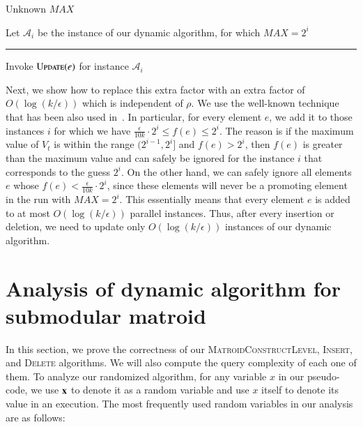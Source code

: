 \documentclass[11pt]{article}
\newcommand{\ceil}[1]{\left\lceil #1 \right\rceil}
\newcommand{\floor}[1]{\left\lfloor #1 \right\rfloor}
\newcommand{\mO}{O}
\newcommand{\update}{\textsc{Update}}
\newcommand{\MatroidConstLevel}{\textsc{MatroidConstructLevel}}
\newcommand{\insertv}{{\textsc{Insert}}}
\newcommand{\deletev}{{\textsc{Delete}}}
\begin{document}
\begin{algorithm}[h] 
\caption{Unknown $MAX$} 
\begin{algorithmic}[1]
    \State Let $\mathcal{A}_i$ be the instance of our dynamic algorithm, for which $MAX=2^i$
    
     \rule{15cm}{0.4pt} 
    
        \For{\textbf{each} $i \in \left[\ceil{\log{f(e)}},\floor{\log{\left(\frac{10k}{\epsilon}\cdot f(e)\right)}}\right]$} 
            \State Invoke $\update(e)$ for instance $\mathcal{A}_i$
        \EndFor
    \EndFunction
\end{algorithmic}
\end{algorithm}





Next, we show how to replace this extra factor with 
an extra factor of $\mO(\log{(k/\epsilon)})$ which is independent of $\rho$. 
We use the well-known technique that has been also used in~\cite{DBLP:conf/nips/LattanziMNTZ20}. 
In particular, for every element $e$, we add it to those instances $i$ 
for which we have $\frac{\epsilon}{10k}\cdot{2^i} \leq f(e) \leq 2^i$.
The reason is if the maximum value of $V_t$ is within the range $(2^{i-1},2^i]$ and 
$f(e) > 2^i$, then $f(e)$ is greater than the maximum value and can safely be ignored for the instance $i$ 
that corresponds to the guess $2^i$. 
On the other hand, we can safely ignore all elements $e$ whose $f(e) < \frac{\epsilon}{10k}\cdot{2^i}$, 
since these elements will never be a promoting element in the run with $MAX = 2^i$.
This essentially means that every element $e$ is added to at most 
$\mO(\log{(k/\epsilon)})$ parallel instances. 
Thus, after every insertion or deletion, 
we need to update only $\mO(\log{(k/\epsilon)})$ instances of our dynamic algorithm.




\section{Analysis of dynamic algorithm for submodular matroid}
\label{sec:matroid:analysis}

In this section, we prove the correctness of our \MatroidConstLevel{}, \insertv{}, and \deletev{} algorithms. We will also compute the query complexity of each one of them. To analyze our randomized algorithm, for any variable $x$ in our pseudo-code, we use $\bold{x}$ to denote it as a random variable and use $x$ itself to denote its value in an execution.
The most frequently used random variables in our analysis are as follows:
\end{document}
